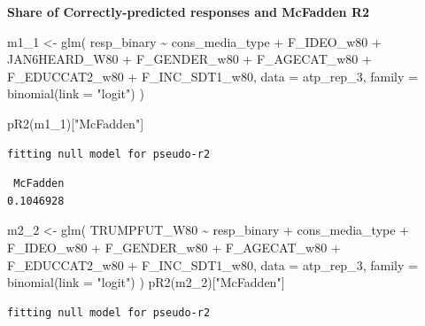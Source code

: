 \documentclass[
  letterpaper,
  DIV=11,
  numbers=noendperiod]{scrartcl}
\newenvironment{Shaded}{\begin{snugshade}}{\end{snugshade}}
\newcommand{\AttributeTok}[1]{\textcolor[rgb]{0.40,0.45,0.13}{#1}}
\newcommand{\FunctionTok}[1]{\textcolor[rgb]{0.28,0.35,0.67}{#1}}
\newcommand{\NormalTok}[1]{\textcolor[rgb]{0.00,0.23,0.31}{#1}}
\newcommand{\OtherTok}[1]{\textcolor[rgb]{0.00,0.23,0.31}{#1}}
\newcommand{\SpecialCharTok}[1]{\textcolor[rgb]{0.37,0.37,0.37}{#1}}
\newcommand{\StringTok}[1]{\textcolor[rgb]{0.13,0.47,0.30}{#1}}
\begin{document}
\textbf{Share of Correctly-predicted responses and McFadden R2}

\begin{Shaded}
\begin{Highlighting}[]
\NormalTok{m1\_1 }\OtherTok{\textless{}{-}} \FunctionTok{glm}\NormalTok{(}
\NormalTok{  resp\_binary }\SpecialCharTok{\textasciitilde{}}\NormalTok{ cons\_media\_type }\SpecialCharTok{+}\NormalTok{ F\_IDEO\_w80 }\SpecialCharTok{+}\NormalTok{ JAN6HEARD\_W80 }\SpecialCharTok{+}
\NormalTok{    F\_GENDER\_w80 }\SpecialCharTok{+}\NormalTok{ F\_AGECAT\_w80 }\SpecialCharTok{+}\NormalTok{ F\_EDUCCAT2\_w80 }\SpecialCharTok{+}\NormalTok{ F\_INC\_SDT1\_w80,}
  \AttributeTok{data =}\NormalTok{ atp\_rep\_3,}
  \AttributeTok{family =} \FunctionTok{binomial}\NormalTok{(}\AttributeTok{link =} \StringTok{"logit"}\NormalTok{)}
\NormalTok{)}

\FunctionTok{pR2}\NormalTok{(m1\_1)[}\StringTok{"McFadden"}\NormalTok{]}
\end{Highlighting}
\end{Shaded}

\begin{verbatim}
fitting null model for pseudo-r2
\end{verbatim}

\begin{verbatim}
 McFadden 
0.1046928 
\end{verbatim}

\begin{Shaded}
\begin{Highlighting}[]
\NormalTok{m2\_2 }\OtherTok{\textless{}{-}} \FunctionTok{glm}\NormalTok{(}
\NormalTok{  TRUMPFUT\_W80 }\SpecialCharTok{\textasciitilde{}}\NormalTok{ resp\_binary }\SpecialCharTok{+}\NormalTok{ cons\_media\_type }\SpecialCharTok{+}\NormalTok{ F\_IDEO\_w80 }\SpecialCharTok{+}
\NormalTok{    F\_GENDER\_w80 }\SpecialCharTok{+}\NormalTok{ F\_AGECAT\_w80 }\SpecialCharTok{+}\NormalTok{ F\_EDUCCAT2\_w80 }\SpecialCharTok{+}\NormalTok{ F\_INC\_SDT1\_w80,}
  \AttributeTok{data =}\NormalTok{ atp\_rep\_3,}
  \AttributeTok{family =} \FunctionTok{binomial}\NormalTok{(}\AttributeTok{link =} \StringTok{"logit"}\NormalTok{)}
\NormalTok{)}
\FunctionTok{pR2}\NormalTok{(m2\_2)[}\StringTok{"McFadden"}\NormalTok{]}
\end{Highlighting}
\end{Shaded}

\begin{verbatim}
fitting null model for pseudo-r2
\end{verbatim}
\end{document}
